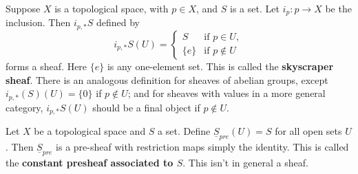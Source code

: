 \begin{example}
    Suppose $X$ is a topological space, with $p \in X$, and $S$ is a set. Let $i_p:p\rightarrow X$ be the inclusion. Then $i_{p,*}S$ defined by $$i_{p,*}S(U) = \left\{\begin{array}{lc} S & \text{if } p \in U, \\ \{e\}&\text{if }p \notin U\end{array}\right.$$
    forms a sheaf. Here $\{e\}$ is any one-element set. This is called the \textbf{skyscraper sheaf}. There is an analogous definition for sheaves of abelian groups, except $i_{p,*}(S)(U) = \{0\}$ if $p \notin U$; and for sheaves with values in a more general category, $i_{p,*}S(U)$ should be a final object if $p \notin U$.
\end{example}

\begin{example}
    Let $X$ be a topological space and $S$ a set. Define $\underline{S}_{pre}(U) = S$ for all open sets $U$. Then $\underline{S}_{pre}$ is a pre-sheaf with restriction maps simply the identity. This is called the \textbf{constant presheaf associated to $S$}. This isn't in general a sheaf.
\end{example}


